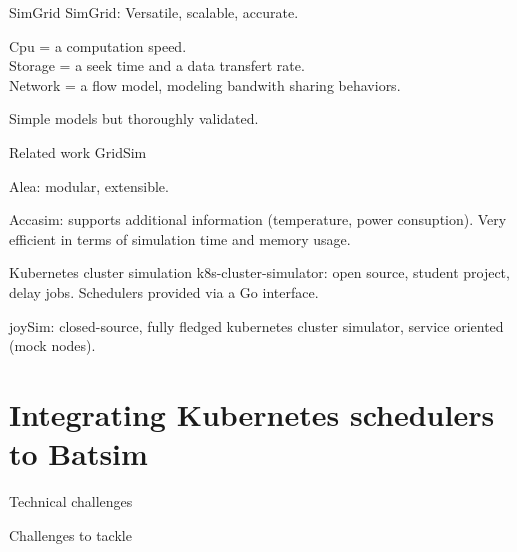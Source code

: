 \documentclass[12pt, aspectratio=43]{beamer}
\begin{document}
\begin{frame}{SimGrid}
	SimGrid: Versatile, scalable, accurate.

	Cpu = a computation speed.\\
	Storage = a seek time and a data transfert rate.\\
	Network = a flow model, modeling bandwith sharing behaviors.

	Simple models but thoroughly validated.
\end{frame}


\begin{frame}{Related work}
	GridSim

	Alea: modular, extensible.

	Accasim: supports additional information (temperature, power
	consuption). Very efficient in terms of simulation time and memory
	usage.
\end{frame}

\begin{frame}{Kubernetes cluster simulation}
	k8s-cluster-simulator: open source, student project, delay jobs.
	Schedulers provided via a Go interface.

	joySim: closed-source, fully fledged kubernetes cluster simulator,
	service oriented (mock nodes).
\end{frame}

\section{Integrating Kubernetes schedulers to Batsim}

\begin{frame}{Technical challenges}
	\begin{alertblock}{Challenges to tackle}
		\begin{enumerate}
		\end{enumerate}
	\end{alertblock}
\end{frame}
\end{document}
